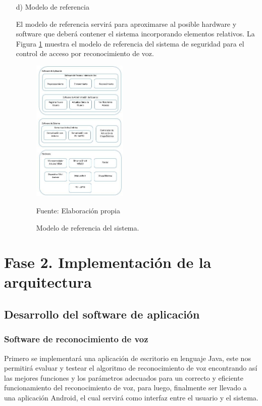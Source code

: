 \begin{enumerate}
\item[d)]Modelo de referencia
\par
El modelo de referencia servirá para aproximarse al posible hardware y software que deberá contener el sistema incorporando elementos relativos. La Figura \ref{fig:figura3.3} muestra el modelo de referencia del sistema de seguridad para el control de acceso por reconocimiento de voz.
\begin{figure}[H]
\captionsetup{justification=centering}
\begin{center}
\includegraphics[width=0.43\textwidth]{Imagenes/Cap3/image003}
\end{center}
\begin{center}
\vskip -0.5cm
\caption{\small{Modelo de referencia del sistema.}}
\label{fig:figura3.3}
{\small{Fuente: Elaboración propia}}
\end{center}
\end{figure}
\end{enumerate}

\section{Fase 2. Implementación de la arquitectura}
\subsection{Desarrollo del software de aplicación}
\subsubsection{Software de reconocimiento de voz}
Primero se implementará una aplicación de escritorio en lenguaje Java, este nos permitirá evaluar y testear el algoritmo de reconocimiento de voz encontrando así las mejores funciones y los parámetros adecuados para un correcto y eficiente funcionamiento del reconocimiento de voz, para luego, finalmente ser llevado a una aplicación Android, el cual servirá como interfaz entre el usuario y el sistema.

